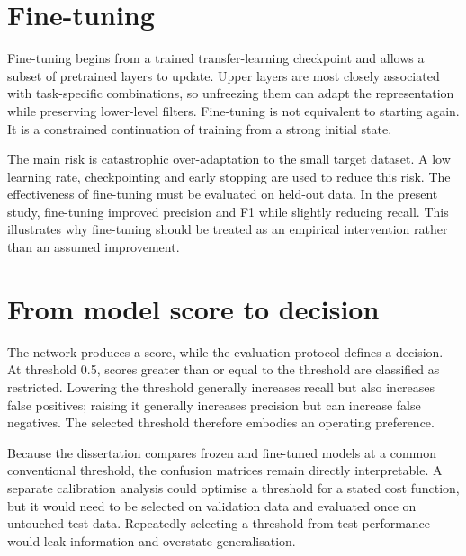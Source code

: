 \section{Fine-tuning}
Fine-tuning begins from a trained transfer-learning checkpoint and allows a subset of pretrained layers to update. Upper layers are most closely associated with task-specific combinations, so unfreezing them can adapt the representation while preserving lower-level filters. Fine-tuning is not equivalent to starting again. It is a constrained continuation of training from a strong initial state.

The main risk is catastrophic over-adaptation to the small target dataset. A low learning rate, checkpointing and early stopping are used to reduce this risk. The effectiveness of fine-tuning must be evaluated on held-out data. In the present study, fine-tuning improved precision and F1 while slightly reducing recall. This illustrates why fine-tuning should be treated as an empirical intervention rather than an assumed improvement.

\section{From model score to decision}
The network produces a score, while the evaluation protocol defines a decision. At threshold 0.5, scores greater than or equal to the threshold are classified as restricted. Lowering the threshold generally increases recall but also increases false positives; raising it generally increases precision but can increase false negatives. The selected threshold therefore embodies an operating preference.

Because the dissertation compares frozen and fine-tuned models at a common conventional threshold, the confusion matrices remain directly interpretable. A separate calibration analysis could optimise a threshold for a stated cost function, but it would need to be selected on validation data and evaluated once on untouched test data. Repeatedly selecting a threshold from test performance would leak information and overstate generalisation.

